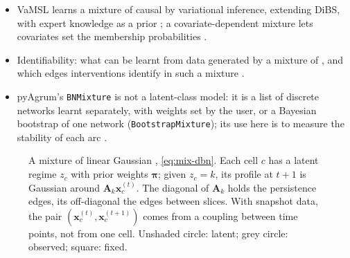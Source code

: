 \documentclass[11pt,a4paper]{article}
\begin{document}
\begin{itemize}
\begin{itemize}
                \parencite{bayerNetworkbasedClusteringUnveils2025,kuipersEfficientSamplingStructure2022}.
          \item VaMSL learns a mixture of causal  by variational inference, extending DiBS, with expert
                knowledge as a prior \parencite{bjorkmanIncorporatingExpertKnowledge2026};
                a covariate-dependent mixture lets covariates set the membership probabilities
                \parencite{marchantCovariateDependentMixture2025}.
          \item Identifiability: what can be learnt from data generated by a mixture of 
                \parencite{saeedCausalStructureDiscovery2020}, and which edges interventions
                identify in such a mixture \parencite{variciInterventionalCausalDiscovery2024}.
          \item pyAgrum's \texttt{BNMixture} is not a latent-class model: it is a list of discrete networks learnt
                separately, with weights set by the user, or a Bayesian bootstrap of one network
                (\texttt{BootstrapMixture}); its use here is to measure the stability of each arc
                \parencite{pyagrumBNMixture2026}.
        \end{itemize}
\end{itemize}

\begin{figure}[tbp]
\centering
{}

\caption{A mixture of linear Gaussian , \cref{eq:mix-dbn}. Each cell $c$ has a latent regime
$z_c$ with prior weights $\bm\pi$; given $z_c=k$, its profile at $t+1$ is Gaussian around $\bm A_k\bm x^{(t)}_c$.
The diagonal of $\bm A_k$ holds the persistence edges, its off-diagonal the edges between slices. With snapshot
data, the pair $(\bm x^{(t)}_c,\bm x^{(t+1)}_c)$ comes from a coupling between time points, not from one cell.
Unshaded circle: latent; grey circle: observed; square: fixed.}
\label{fig:mix-dbn}
\end{figure}
\end{document}
